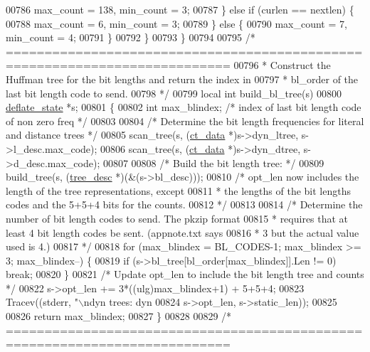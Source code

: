 \begin{DoxyCode}
{{{{{{{{{{{{{00786             max\_count = 138, min\_count = 3;
00787         \} \textcolor{keywordflow}{else} \textcolor{keywordflow}{if} (curlen == nextlen) \{
00788             max\_count = 6, min\_count = 3;
00789         \} \textcolor{keywordflow}{else} \{
00790             max\_count = 7, min\_count = 4;
00791         \}
00792     \}
00793 \}
00794 
00795 \textcolor{comment}{/* ===========================================================================}
00796 \textcolor{comment}{ * Construct the Huffman tree for the bit lengths and return the index in}
00797 \textcolor{comment}{ * bl\_order of the last bit length code to send.}
00798 \textcolor{comment}{ */}
00799 local \textcolor{keywordtype}{int} build\_bl\_tree(s)
00800     \hyperlink{structinternal__state}{deflate\_state} *s;
00801 \{
00802     \textcolor{keywordtype}{int} max\_blindex;  \textcolor{comment}{/* index of last bit length code of non zero freq */}
00803 
00804     \textcolor{comment}{/* Determine the bit length frequencies for literal and distance trees */}
00805     scan\_tree(s, (\hyperlink{structct__data__s}{ct\_data} *)s->dyn\_ltree, s->l\_desc.max\_code);
00806     scan\_tree(s, (\hyperlink{structct__data__s}{ct\_data} *)s->dyn\_dtree, s->d\_desc.max\_code);
00807 
00808     \textcolor{comment}{/* Build the bit length tree: */}
00809     build\_tree(s, (\hyperlink{structtree__desc__s}{tree\_desc} *)(&(s->bl\_desc)));
00810     \textcolor{comment}{/* opt\_len now includes the length of the tree representations, except}
00811 \textcolor{comment}{     * the lengths of the bit lengths codes and the 5+5+4 bits for the counts.}
00812 \textcolor{comment}{     */}
00813 
00814     \textcolor{comment}{/* Determine the number of bit length codes to send. The pkzip format}
00815 \textcolor{comment}{     * requires that at least 4 bit length codes be sent. (appnote.txt says}
00816 \textcolor{comment}{     * 3 but the actual value used is 4.)}
00817 \textcolor{comment}{     */}
00818     \textcolor{keywordflow}{for} (max\_blindex = BL\_CODES-1; max\_blindex >= 3; max\_blindex--) \{
00819         \textcolor{keywordflow}{if} (s->bl\_tree[bl\_order[max\_blindex]].Len != 0) \textcolor{keywordflow}{break};
00820     \}
00821     \textcolor{comment}{/* Update opt\_len to include the bit length tree and counts */}
00822     s->opt\_len += 3*((ulg)max\_blindex+1) + 5+5+4;
00823     Tracev((stderr, \textcolor{stringliteral}{"\(\backslash\)ndyn trees: dyn %
00824             s->opt\_len, s->static\_len));
00825 
00826     \textcolor{keywordflow}{return} max\_blindex;
00827 \}
00828 
00829 \textcolor{comment}{/* ===========================================================================}
}}}}}}}}}}}}}}
\end{DoxyCode}
